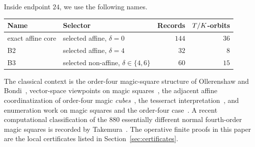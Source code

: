 \begin{definition}
Inside endpoint \(24\), we use the following names.
\begin{center}
\begin{tabular}{llrr}
\toprule
Name & Selector & Records & \(T/K\)-orbits\\
\midrule
exact affine core & selected affine, \(\delta=0\) & \(144\) & \(36\)\\
B2 & selected affine, \(\delta=4\) & \(32\) & \(8\)\\
B3 & selected non-affine, \(\delta\in\{4,6\}\) & \(60\) & \(15\)\\
\bottomrule
\end{tabular}
\end{center}
\end{definition}

The classical context is the order-four magic-square structure of Ollerenshaw
and Bondi~\cite{ollerenshawBondi}, vector-space viewpoints on magic
squares~\cite{wardMagicVectorSpaces}, the adjacent affine coordinatization of order-four magic \emph{cubes}~\cite{Duangmoon2022}, the \Durer tesseract
interpretation~\cite{sudberyTesseract}, and enumeration work on magic squares
and the order-four case~\cite{beckCohenCuomoGribelyukMagic,
beckVanHerick4x4Enumeration}.  A recent
computational classification of the 880 essentially different normal
fourth-order magic squares is recorded by Takemura~\cite{takemura880}.  The
operative finite proofs in this paper are the local certificates listed in
Section~\ref{sec:certificates}.